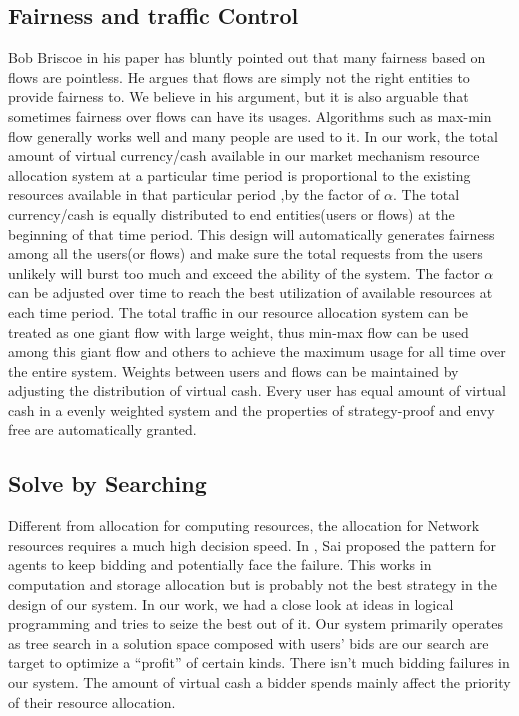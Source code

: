 \documentclass[a4paper,11pt,twocolumn]{article}
\begin{document}
\subsection{Fairness and traffic Control }
Bob Briscoe in his paper\cite{bob} has bluntly pointed out that many fairness based on flows are pointless. He argues that
 flows are simply not the right
entities to provide fairness to. We believe in his argument, but it is also arguable that sometimes fairness over flows
can have its usages. Algorithms such as max-min flow generally works well and many people are used to it. In our
work, the total amount of virtual currency/cash  available in our market mechanism resource allocation system at a 
particular time period is proportional to the existing resources available in that  particular period ,by the 
factor of $\alpha$. The total currency/cash is equally distributed to end entities(users or flows) at the beginning of that
 time period. This design will automatically generates fairness among all the users(or flows) and make sure the 
total requests from the users unlikely will  burst too much and exceed the ability of the system. 
The factor $\alpha$ can be 
adjusted over time to reach the best utilization of available resources at each time period. The total traffic 
in  our resource allocation system can be treated as one giant flow with large weight, thus min-max flow can be used
among this  giant flow and others to achieve the maximum usage for all time over the entire system. Weights between users and flows can be 
maintained by adjusting the distribution of virtual cash. Every user has equal amount of virtual cash in a evenly 
weighted system and the properties of strategy-proof and envy free are automatically granted.


\subsection{Solve by Searching}
Different from allocation for computing resources, the allocation for Network resources requires a much high 
decision speed. In \cite{Sai}, Sai proposed the pattern for agents to keep bidding and potentially face the failure. This works in computation and storage allocation but is
probably not the best strategy in the design of our system. In our work, we had a close look at ideas in logical programming
and tries to seize the best out of it. Our system primarily operates as tree search in a solution space composed
with users' bids are our search are target to optimize a ``profit'' of certain kinds. There isn't much bidding failures
in our system. The amount of virtual cash a bidder spends mainly affect the priority of their resource allocation. 
\end{document}
